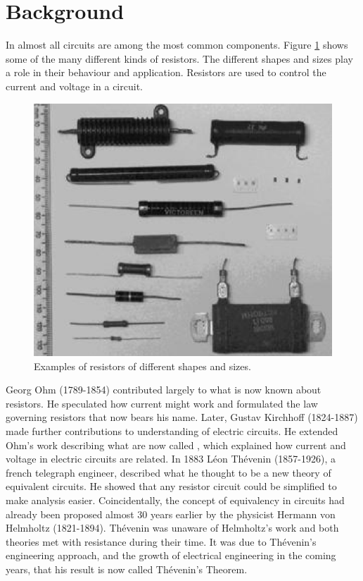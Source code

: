 \section{Background}

In almost all circuits  are among the most common components. Figure \ref{fig:DC2} shows some of the many different kinds of resistors. The different shapes and sizes play a role in their behaviour and application. Resistors are used to control the current and voltage in a circuit.

\begin{figure}[H]
    \centering
    \includegraphics[scale = 0.8]{Images/DC2.PNG}
    \caption{Examples of resistors of different shapes and sizes.}
    \label{fig:DC2}
\end{figure}

Georg Ohm (1789-1854) contributed largely to what is now known about resistors. He speculated how current might work and formulated the law governing resistors that now bears his name. Later, Gustav Kirchhoff (1824-1887) made further contributions to understanding of electric circuits. He extended Ohm's work describing what are now called , which explained how current and voltage in electric circuits are related. In 1883 L\'{e}on Th\'{e}venin (1857-1926), a french telegraph engineer, described what he thought to be a new theory of equivalent circuits. He showed that any resistor circuit could be simplified to make analysis easier. Coincidentally, the concept of equivalency in circuits had already been proposed almost 30 years earlier by the physicist Hermann von Helmholtz (1821-1894). Th\'{e}venin was unaware of Helmholtz's work and both theories met with resistance during their time. It was due to Th\'{e}venin's engineering approach, and the growth of electrical engineering in the coming years, that his result is now called Th\'{e}venin's Theorem.

